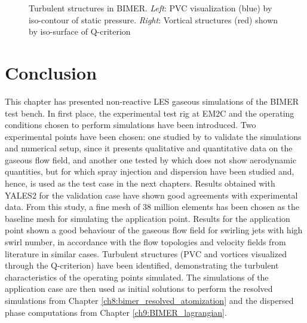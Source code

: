 \begin{figure}[ht]
\begin{subfigure}[b]{0.4\textwidth}
   \label{fig:BIMER_application_Qcrit}
\end{subfigure}
\caption[Turbulent structures in BIMER]{Turbulent structures in BIMER. \textsl{Left}: PVC visualization (blue) by iso-contour of static pressure. \textsl{Right}: Vortical structures (red) shown by iso-surface of Q-criterion}
\label{fig:BIMER_application_turbulent_structures}
\end{figure}






\section{Conclusion}

This chapter has presented non-reactive LES gaseous simulations of the BIMER test bench. In first place, the experimental test rig at EM2C and the operating conditions chosen to perform simulations have been introduced. Two experimental points have been chosen: one studied by  to validate the simulations and numerical setup, since it presents qualitative and quantitative data on the gaseous flow field, and another one tested by  which does not show aerodynamic quantities, but for which spray injection and dispersion have been studied and, hence, is used as the test case in the next chapters. Results obtained with YALES2 for the validation case have shown good agreements with experimental data. From this study, a fine mesh of 38 million elements has been chosen as the baseline mesh for simulating the application point. Results for the application point shown a good behaviour of the gaseous flow field for swirling jets with high swirl number, in accordance with the flow topologies and velocity fields from literature in similar cases. Turbulent structures (PVC and vortices visualized through the Q-criterion) have been identified, demonstrating the turbulent characteristics of the operating points simulated. The simulations of the application case are then used as initial solutions to perform the resolved simulations from Chapter \ref{ch8:bimer_resolved_atomization} and the dispersed phase computations from Chapter \ref{ch9:BIMER_lagrangian}.

%